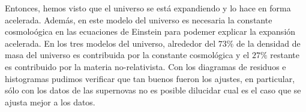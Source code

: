 Entonces, hemos visto que el universo se está expandiendo y lo hace en forma acelerada. Además, en este modelo del universo es 
necesaria la constante cosmoloógica en las ecuaciones de Einstein para podemer explicar la expansión acelerada. En los tres modelos
del universo, alrededor del $73\%$ de la densidad de masa del universo es contribuida por la constante cosmológica y el $27\%$
restante es contribuido por la materia no-relativista. Con los diagramas de residuos e histogramas pudimos verificar que tan buenos fueron
los ajustes, en particular, sólo con los datos de las supernovas no es posible dilucidar cual es el caso que se ajusta mejor a los datos.